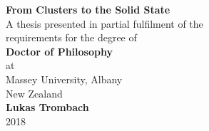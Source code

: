 
\begin{titlepage}
\begin{center}
\vspace*{10mm}
    \LARGE{\textbf{From Clusters to the Solid State
    }}\\\vspace{2cm}
    \large{
    A thesis presented in partial fulfilment of the \\ requirements for the degree of 
    }\\\vspace{2cm}
    \large{\textbf{
    Doctor of Philosophy
    }}\\\vspace{2cm}
    \large{at \\ Massey University, Albany \\ New Zealand}\\\vspace{2cm}
    \large{\textbf{Lukas Trombach}}\\\vspace{1.5cm}
    \large{2018}
    
\end{center}
\end{titlepage}
